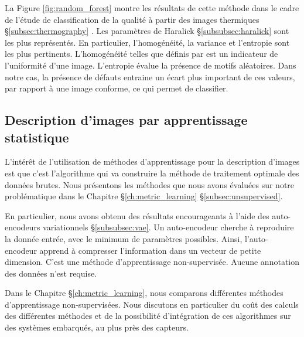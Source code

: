La Figure \ref{fig:random_forest} montre les résultats de cette méthode dans le cadre de l'étude de classification de la qualité à partir des images thermiques §\ref{subsec:thermography} \cite{nagorny_quality_2017}.
Les paramètres de Haralick §\ref{subsubsec:haralick} sont les plus représentés.
En particulier, l'homogénéité, la variance et l'entropie sont les plus pertinents.
L'homogénéité telles que définis par \citeauthor{haralick_textural_1973} est un indicateur de l'uniformité d'une image.
L'entropie évalue la présence de motifs aléatoires.
Dans notre cas, la présence de défauts entraine un écart plus important de ces valeurs, par rapport à une image conforme, ce qui permet de classifier.



\subsection{Description d'images par apprentissage statistique}
L'intérêt de l'utilisation de méthodes d'apprentissage pour la description d'images est que c'est l'algorithme qui va construire la méthode de traitement optimale des données brutes.
Nous présentons les méthodes que nous avons évaluées sur notre problématique dans le Chapitre §\ref{ch:metric_learning} §\ref{subsec:unsupervised}.

En particulier, nous avons obtenu des résultats encourageants à l'aide des auto-encodeurs variationnels §\ref{subsubsec:vae}.
Un auto-encodeur cherche à reproduire la donnée entrée, avec le minimum de paramètres possibles.
Ainsi, l'auto-encodeur apprend à compresser l'information dans un vecteur de petite dimension.
C'est une méthode d'apprentissage non-supervisée.
Aucune annotation des données n'est requise.

Dans le Chapitre §\ref{ch:metric_learning}, nous comparons différentes méthodes d'apprentissage non-supervisées.
Nous discutons en particulier du coût des calculs des différentes méthodes et de la possibilité d'intégration de ces algorithmes sur des systèmes embarqués, au plus près des capteurs.


